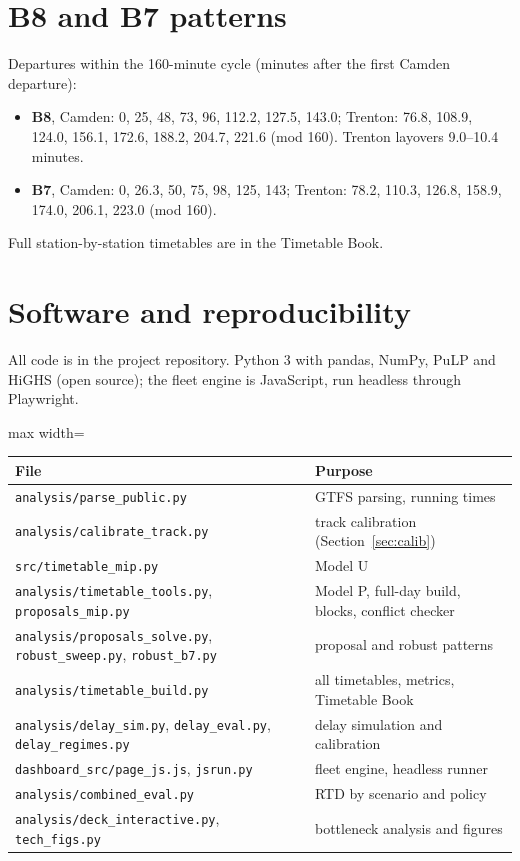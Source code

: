 \documentclass[11pt]{article}
\begin{document}
\section{B8 and B7 patterns}
Departures within the 160-minute cycle (minutes after the first Camden departure):
\begin{itemize}
\item \textbf{B8}, Camden: 0, 25, 48, 73, 96, 112.2, 127.5, 143.0; Trenton: 76.8, 108.9, 124.0, 156.1, 172.6, 188.2, 204.7, 221.6 (mod 160). Trenton layovers 9.0--10.4 minutes.
\item \textbf{B7}, Camden: 0, 26.3, 50, 75, 98, 125, 143; Trenton: 78.2, 110.3, 126.8, 158.9, 174.0, 206.1, 223.0 (mod 160).
\end{itemize}
Full station-by-station timetables are in the Timetable Book.

\section{Software and reproducibility}
All code is in the project repository. Python 3 with pandas, NumPy, PuLP and HiGHS (open source); the fleet engine is JavaScript, run headless through Playwright.
\begin{center}\small
\begin{adjustbox}{max width=\linewidth}
\begin{tabular}{@{}ll@{}}
\toprule
File & Purpose \\ \midrule
\texttt{analysis/parse\_public.py} & GTFS parsing, running times \\
\texttt{analysis/calibrate\_track.py} & track calibration (Section~\ref{sec:calib}) \\
\texttt{src/timetable\_mip.py} & Model U \\
\texttt{analysis/timetable\_tools.py}, \texttt{proposals\_mip.py} & Model P, full-day build, blocks, conflict checker \\
\texttt{analysis/proposals\_solve.py}, \texttt{robust\_sweep.py}, \texttt{robust\_b7.py} & proposal and robust patterns \\
\texttt{analysis/timetable\_build.py} & all timetables, metrics, Timetable Book \\
\texttt{analysis/delay\_sim.py}, \texttt{delay\_eval.py}, \texttt{delay\_regimes.py} & delay simulation and calibration \\
\texttt{dashboard\_src/page\_js.js}, \texttt{jsrun.py} & fleet engine, headless runner \\
\texttt{analysis/combined\_eval.py} & RTD by scenario and policy \\
\texttt{analysis/deck\_interactive.py}, \texttt{tech\_figs.py} & bottleneck analysis and figures \\
\bottomrule
\end{tabular}
\end{adjustbox}
\end{center}
\end{document}

